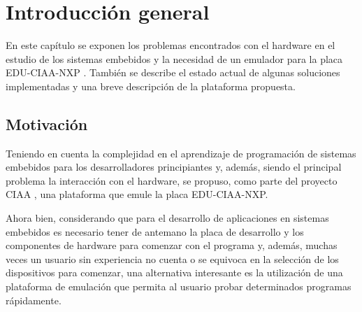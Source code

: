 
\chapter{Introducción general} %

\label{Chapter1} %
\label{IntroGeneral}


\newcommand{\keyword}[1]{\textbf{#1}}
\newcommand{\tabhead}[1]{\textbf{#1}}
\newcommand{\code}[1]{\texttt{#1}}
\newcommand{\file}[1]{\texttt{\bfseries#1}}
\newcommand{\option}[1]{\texttt{\itshape#1}}
\newcommand{\grados}{$^{\circ}$}



En este capítulo se exponen los problemas encontrados con el hardware en el estudio de los sistemas embebidos y la necesidad de un emulador para la placa EDU-CIAA-NXP \citep{EDU-CIAA-NXP}. También se describe el estado actual de algunas soluciones implementadas y una breve descripción de la plataforma propuesta.

\section{Motivación}

Teniendo en cuenta la complejidad en el aprendizaje de programación de sistemas embebidos para los desarrolladores principiantes y, además, siendo el principal problema la interacción con el hardware, se propuso, como parte del proyecto CIAA \citep{CIAA}, una plataforma que emule la placa EDU-CIAA-NXP.

Ahora bien, considerando que para el desarrollo de aplicaciones en sistemas embebidos es necesario tener de antemano la placa de desarrollo y los componentes de hardware para comenzar con el programa y, además, muchas veces un usuario sin experiencia no cuenta o se equivoca en la selección de los dispositivos para comenzar, una alternativa interesante es la utilización de una plataforma de emulación que permita al usuario probar determinados programas rápidamente.

